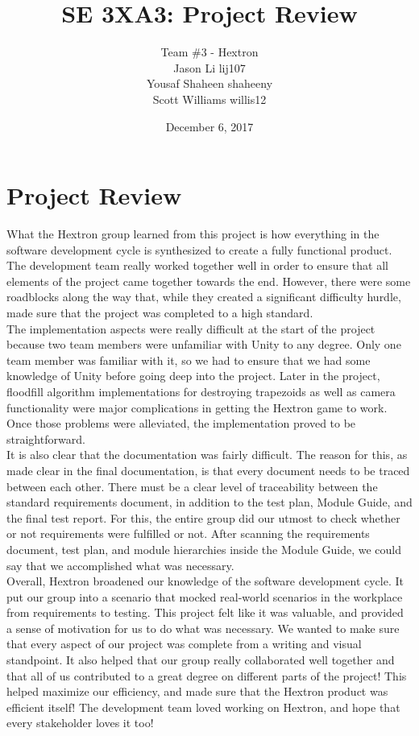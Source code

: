 \documentclass[12pt, titlepage]{article}
\title{SE 3XA3: Project Review}
\author{Team \#3 - Hextron
		\\ Jason Li lij107
		\\ Yousaf Shaheen shaheeny
		\\ Scott Williams willis12
}
\date{December 6, 2017}
\begin{document}
\maketitle



\newpage 

\section{Project Review}

\indent What the Hextron group learned from this project is how everything in the software development cycle is synthesized to create a fully functional product. The development team really worked together well in order to ensure that all elements of the project came together towards the end. However, there were some roadblocks along the way that, while they created a significant difficulty hurdle, made sure that the project was completed to a high standard.\\
\newline 
\indent The implementation aspects were really difficult at the start of the project because two team members were unfamiliar with Unity to any degree. Only one team member was familiar with it, so we had to ensure that we had some knowledge of Unity before going deep into the project. Later in the project, floodfill algorithm implementations for destroying trapezoids as well as camera functionality were major complications in getting the Hextron game to work. Once those problems were alleviated, the implementation proved to be straightforward.\\

\indent It is also clear that the documentation was fairly difficult. The reason for this, as made clear in the final documentation, is that every document needs to be traced between each other. There must be a clear level of traceability between the standard requirements document, in addition to the test plan, Module Guide, and the final test report. For this, the entire group did our utmost to check whether or not requirements were fulfilled or not. After scanning the requirements document, test plan, and module hierarchies  inside the Module Guide, we could say that we accomplished what was necessary.\\
\newline 
\indent Overall, Hextron broadened our knowledge of the software development cycle. It put our group into a scenario that mocked real-world scenarios in the workplace from requirements to testing. This project felt like it was valuable, and provided a sense of motivation for us to do what was necessary. We wanted to make sure that every aspect of our project was complete from a writing and visual standpoint. It also helped that our group really collaborated well together and that all of us contributed to a great degree on different parts of the project! This helped maximize our efficiency, and made sure that the Hextron product was efficient itself! The development team loved working on Hextron, and hope that every stakeholder loves it too! 
\end{document}
